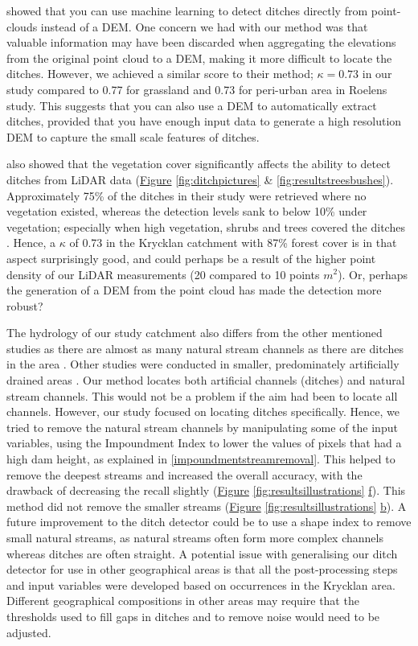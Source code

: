 \documentclass[]{interact}
\theoremstyle{plain}%
\theoremstyle{definition}
\theoremstyle{remark}
\begin{document}
\citet{roelens} showed that you can use machine learning to detect ditches directly from point-clouds instead of a DEM. One concern we had with our method was that valuable information may have been discarded when aggregating the elevations from the original point cloud to a DEM, making it more difficult to locate the ditches. However, we achieved a similar score to their method; $\kappa=0.73$ in our study compared to 0.77 for grassland and 0.73 for peri-urban area in Roelens study. This suggests that you can also use a DEM to automatically extract ditches, provided that you have enough input data to generate a high resolution DEM to capture the small scale features of ditches. 

\citet{bailly} also showed that the vegetation cover significantly affects the ability to detect ditches from LiDAR data (\hyperref[fig:ditchpictures]{Figure} \ref{fig:ditchpictures} \& \ref{fig:resultstreesbushes}). Approximately 75\% of the ditches in their study were retrieved where no vegetation existed, whereas the detection levels sank to below 10\% under vegetation; especially when high vegetation, shrubs and trees covered the ditches \citep{bailly}. Hence, a $\kappa$ of 0.73 in the Krycklan catchment with  87\% forest cover \citep{krycklancatchment} is in that aspect surprisingly good, and could perhaps be a result of the higher point density of our LiDAR measurements (20 compared to 10 points $m^{2}$). Or, perhaps the generation of a DEM from the point cloud has made the detection more robust?  

The hydrology of our study catchment also differs from the other mentioned studies as there are almost as many natural stream channels as there are ditches in the area \citep{hasselquist, mappingtemporal}. Other studies were conducted in smaller, predominately artificially drained areas \citep{roelens, bailly, rapinel}. Our method locates both artificial channels (ditches) and natural stream channels. This would not be a problem if the aim had been to locate all channels. However, our study focused on locating ditches specifically. Hence, we tried to remove the natural stream channels by manipulating some of the input variables, using the Impoundment Index to lower the values of pixels that had a high dam height, as explained in \ref{impoundmentstreamremoval}. This helped to remove the deepest streams and increased the overall accuracy, with the drawback of decreasing the recall slightly (\hyperref[fig:resultsillustrations]{Figure} \ref{fig:resultsillustrations} \hyperref[fig:resultsillustrations]{f}). This method did not remove the smaller streams (\hyperref[fig:resultsillustrations]{Figure} \ref{fig:resultsillustrations} \hyperref[fig:resultsillustrations]{b}). A future improvement to the ditch detector could be to use a shape index to remove small natural streams, as natural streams often form more complex channels whereas ditches are often straight. A potential issue with generalising our ditch detector for use in other geographical areas is that all the post-processing steps and input variables were developed based on occurrences in the Krycklan area. Different geographical compositions in other areas may require that the thresholds used to fill gaps in ditches and to remove noise would need to be adjusted.
\end{document}
